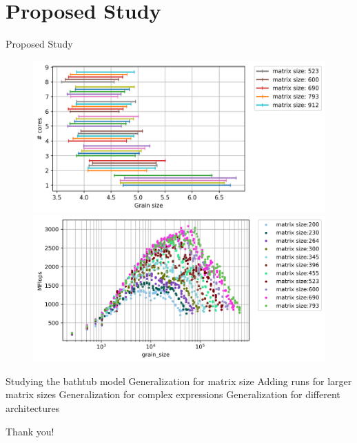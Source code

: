 \documentclass[10pt]{beamer}
\begin{document}
\section{Proposed Study}
\begin{frame}{Proposed Study}
\begin{outline}	
	\begin{figure}[H]
		\centering
		\includegraphics[scale=.25]{images/polyfit/fig_523-912_peak_range_all.png}
		\includegraphics[scale=.25]{images/fig11.png}	
		\label{fig20}
	\end{figure} 
	\1Studying the bathtub model
	\1Generalization for matrix size 
	\1Adding runs for larger matrix sizes
	\1Generalization for complex expressions
	\1Generalization for different architectures
\end{outline}
\end{frame}


\begin{frame}[standout]
  Thank you!
\end{frame}
\end{document}
